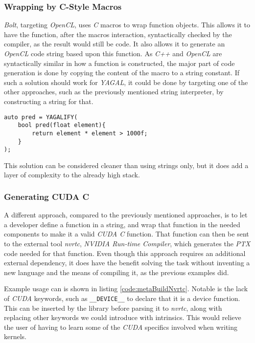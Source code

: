 \subsubsection{Wrapping by C-Style Macros}
\textit{Bolt}, targeting \textit{OpenCL}, uses \textit{C} macros to wrap function objects. This allows it to have the function, after the macros interaction, syntactically checked by the compiler, as the result would still be code. It also allows it to generate an \textit{OpenCL} code string based upon this function. As \textit{C++} and \textit{OpenCL} are syntactically similar in how a function is constructed, the major part of code generation is done by copying the content of the macro to a string constant. If such a solution should work for \textit{YAGAL}, it could be done by targeting one of the other approaches, such as the previously mentioned string interpreter, by constructing a string for that.

\begin{lstlisting}[caption={Code showing possible construction of device function with macro, named YAGALIFY, and \textit{C++} lambda.}, label={code:metaBuildMacro}]
auto pred = YAGALIFY(
    bool pred(float element){
        return element * element > 1000f;
    }
);
\end{lstlisting}

This solution can be considered cleaner than using strings only, but it does add a layer of complexity to the already high stack.

\subsubsection{Generating CUDA C}
A different approach, compared to the previously mentioned approaches, is to let a developer define a function in a string, and wrap that function in the needed components to make it a valid \textit{CUDA C} function. That function can then be sent to the external tool \textit{nvrtc}\cite{nvrtcDoc}, \textit{NVIDIA Run-time Compiler}, which generates the \textit{PTX} code needed for that function. Even though this approach requires an additional external dependency, it does have the benefit solving the task without inventing a new language and the means of compiling it, as the previous examples did.

Example usage can is shown in listing \ref{code:metaBuildNvrtc}. Notable is the lack of \textit{CUDA} keywords, such as \texttt{\_\_DEVICE\_\_} to declare that it is a device function. This can be inserted by the library before parsing it to \textit{nvrtc}, along with replacing other keywords we could introduce with intrinsics. This would relieve the user of having to learn some of the \textit{CUDA} specifics involved when writing kernels.

